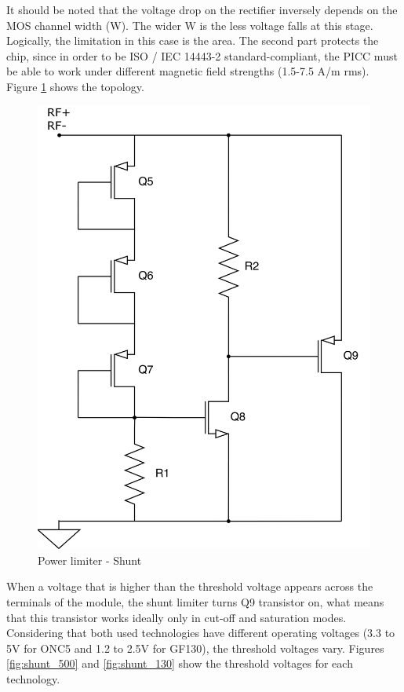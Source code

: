 \documentclass[a4paper, 10pt, conference]{ieeeconf}      %
\begin{document}
It should be noted that the voltage drop on the rectifier inversely depends on the MOS channel width (W). The wider W is the less voltage falls at this stage. Logically, the limitation in this case is the area. The second part protects the chip, since in order to be ISO / IEC 14443-2 standard-compliant, the PICC must be able to work under different magnetic field strengths (1.5-7.5 A/m rms). Figure  \ref{fig:shunt} shows the topology.

\begin{figure}[H]
\centering
\includegraphics[scale=0.045]{Images/ImagenesTesina/circuitos/Shunt.png}
\caption{Power limiter - Shunt}
\label{fig:shunt}
\end{figure}

When a voltage that is higher than the threshold voltage appears across the terminals of the module, the shunt limiter turns Q9 transistor on, what means that this transistor works ideally only in cut-off and saturation modes. 
Considering that both used technologies have different operating voltages (3.3 to 5V for ONC5 and 1.2 to 2.5V for GF130), the threshold voltages vary. Figures \ref{fig:shunt_500} and \ref{fig:shunt_130} show the threshold voltages for each technology.
\end{document}
